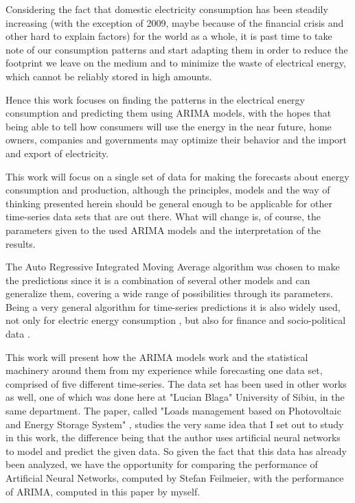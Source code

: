 \documentclass[12pt,a4paper,titlepage]{report}
\begin{document}
Considering the fact that domestic electricity consumption has been steadily increasing (with the exception of 2009, maybe because of the financial crisis and other hard to explain factors) \cite{enerdata} for the world as a whole, it is past time to take note of our consumption patterns and start adapting them in order to reduce the footprint we leave on the medium and to minimize the waste of electrical energy, which cannot be reliably stored in high amounts.

Hence this work focuses on finding the patterns in the electrical energy consumption and predicting them using ARIMA models, with the hopes that being able to tell how consumers will use the energy in the near future, home owners, companies and governments may optimize their behavior and the import and export of electricity.

This work will focus on a single set of data for making the forecasts about energy consumption and production, although the principles, models and the way of thinking presented herein should be general enough to be applicable for other time-series data sets that are out there. What will change is, of course, the parameters given to the used ARIMA models and the interpretation of the results.

The Auto Regressive Integrated Moving Average algorithm was chosen to make the predictions since it is a combination of several other models and can generalize them, covering a wide range of possibilities through its parameters. Being a very general algorithm for time-series predictions it is also widely used, not only for electric energy consumption \cite{bouzerdoum}, but also for finance and socio-political data \cite{fpp2}.

This work will present how the ARIMA models work and the statistical machinery around them from my experience while forecasting one data set, comprised of five different time-series. The data set has been used in other works as well, one of which was done here at "Lucian Blaga" University of Sibiu, in the same department. The paper, called "Loads management based on Photovoltaic and Energy Storage System" \cite{feilmeier}, studies the very same idea that I set out to study in this work, the difference being that the author uses artificial neural networks to model and predict the given data. So given the fact that this data has already been analyzed, we have the opportunity for comparing the performance of Artificial Neural Networks, computed by Stefan Feilmeier, with the performance of ARIMA, computed in this paper by myself.
\end{document}
